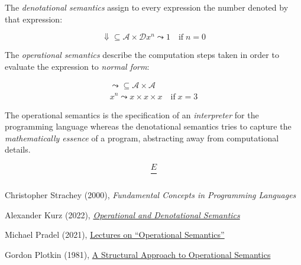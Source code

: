 \documentclass{article}
\begin{document}

\pptToc


The \emph{denotational semantics} assign to every expression the number denoted by that expression:

\begin{equation*}
\Downarrow \subseteq \mathcal{A} \times \mathcal{D}
x^n \leadsto 1 \quad\text{if}\; n = 0
\end{equation*}

The \emph{operational semantics} describe the computation steps taken in order to evaluate the expression to \emph{normal form}:

\begin{gather*}
\leadsto \subseteq \mathcal{A} \times \mathcal{A} \\
x^n \leadsto x \times x \times x \quad\text{if}\; x = 3
\end{gather*}

The operational semantics is the specification of an \emph{interpreter} for the programming language whereas the denotational semantics tries to capture the \emph{mathematically essence} of a program, abstracting away from computational details.



\begin{equation*}
\frac
  {E }
  {}
\end{equation*}

\plush{}


Christopher Strachey (2000),
\emph{Fundamental Concepts in Programming Languages}

Alexander Kurz (2022),
\href{https://hackmd.io/@alexhkurz/Hkf6BTL6P}{\emph{Operational and Denotational Semantics}}

Michael Pradel (2021),
\href{https://www.youtube.com/watch?v=jsBHd3-04oA}{Lectures on ``Operational Semantics''}

Gordon Plotkin (1981),
\href{https://web.eecs.umich.edu/~weimerw/2006-615/reading/plotkin81structural.pdf}{A Structural Approach to Operational Semantics}
\end{document}
